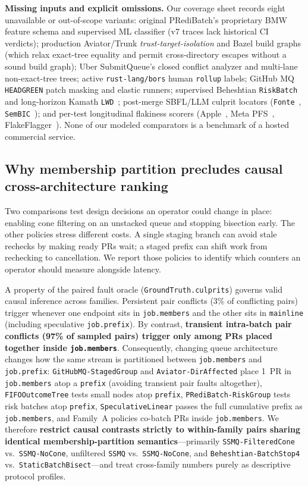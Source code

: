 \textbf{Missing inputs and explicit omissions.} Our coverage sheet records eight unavailable or out-of-scope variants: original PRediBatch's proprietary BMW feature schema and supervised ML classifier (v7 traces lack historical CI verdicts); production Aviator/Trunk \emph{trust-target-isolation} and Bazel build graphs (which relax exact-tree equality and permit cross-directory escapes without a sound build graph); Uber SubmitQueue's closed conflict analyzer and multi-lane non-exact-tree trees; active \texttt{rust-lang/bors} human \texttt{rollup} labels; GitHub MQ \texttt{HEADGREEN} patch masking and elastic runners; supervised Beheshtian \texttt{RiskBatch}~\cite{beheshtian2022software} and long-horizon Kamath \texttt{LWD}~\cite{kamath2025lightweight}; post-merge SBFL/LLM culprit locators (\texttt{Fonte}~\cite{an2023fonte}, \texttt{SemBIC}~\cite{chen2025sembic}); and per-test longitudinal flakiness scorers (Apple~\cite{kowalczyk2020modeling}, Meta PFS~\cite{machalica2020probabilistic}, FlakeFlagger~\cite{alshammari2021flakeflagger}). None of our modeled comparators is a benchmark of a hosted commercial service.

\subsection{Why membership partition precludes causal cross-architecture ranking}
Two comparisons test design decisions an operator could change in place: enabling cone filtering on an unstacked queue and stopping bisection early. The other policies stress different costs. A single staging branch can avoid stale rechecks by making ready PRs wait; a staged prefix can shift work from rechecking to cancellation. We report those policies to identify which counters an operator should measure alongside latency.

A property of the paired fault oracle (\texttt{GroundTruth.culprits}) governs valid causal inference across families. Persistent pair conflicts (3\% of conflicting pairs) trigger whenever one endpoint sits in \texttt{job.members} and the other sits in \texttt{mainline} (including speculative \texttt{job.prefix}). By contrast, \textbf{transient intra-batch pair conflicts (97\% of sampled pairs) trigger only among PRs placed together inside \texttt{job.members}}. Consequently, changing queue architecture changes how the same stream is partitioned between \texttt{job.members} and \texttt{job.prefix}: \texttt{GitHubMQ-StagedGroup} and \texttt{Aviator-DirAffected} place 1~PR in \texttt{job.members} atop a \texttt{prefix} (avoiding transient pair faults altogether), \texttt{FIFOOutcomeTree} tests small nodes atop \texttt{prefix}, \texttt{PRediBatch-RiskGroup} tests risk batches atop \texttt{prefix}, \texttt{SpeculativeLinear} passes the full cumulative prefix as \texttt{job.members}, and Family~A policies co-batch PRs inside \texttt{job.members}. We therefore \textbf{restrict causal contrasts strictly to within-family pairs sharing identical membership-partition semantics}---primarily \texttt{SSMQ-FilteredCone} vs.\ \texttt{SSMQ-NoCone}, unfiltered \texttt{SSMQ} vs.\ \texttt{SSMQ-NoCone}, and \texttt{Beheshtian-BatchStop4} vs.\ \texttt{StaticBatchBisect}---and treat cross-family numbers purely as descriptive protocol profiles.

